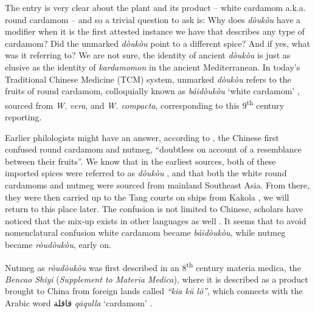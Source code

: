 \documentclass[12pt]{article}
\newcommand{\tc}[1]{\traditionalchinesefont{#1}\rmfamily}
\begin{document}

The entry is very clear about the plant and its product -- white cardamom a.k.a. round cardamom -- and so a trivial question to ask is: Why does \textit{dòukòu} have a modifier when it is the first attested instance we have that describes any type of cardamom? Did the unmarked \textit{dòukòu} point to a different spice? And if yes, what was it referring to? We are not sure, the identity of ancient \textit{dòukòu} is just as elusive as the identity of \textit{kardamomon} in the ancient Mediterranean. In today's Traditional Chinese Medicine (TCM) system, unmarked \textit{dòukòu} refers to the fruits of round cardamom, colloquially known as \textit{báidòukòu} `white cardamom' \parencites[cf.][]{polyu_2024_chinese,hkbu_2024_chinese}, sourced from \textit{W. vera}, and \textit{W. compacta}, corresponding to this 9\textsuperscript{th} century reporting.



Earlier philologists might have an answer, according to \textcite[22]{donkin_2003_east}, the Chinese first confused round cardamom and nutmeg, ``doubtless on account of a resemblance between their fruits''. We know that in the earliest sources, both of these imported spices were referred to as \textit{dòukòu} \parencites{hsu_1967_notes}{donkin_2003_east}, and that both the white round cardamoms and nutmeg were sourced from mainland Southeast Asia. From there, they were then carried up to the Tang courts on ships from Kakola \parencite[184-185]{schafer_1985_golden}, we will return to this place later. The confusion is not limited to Chinese, scholars have noticed that the mix-up exists in other languages as well \parencite[see][]{wolters_1967_early,wheatley_1961_golden}. It seems that to avoid nomenclatural confusion white cardamom became \tc{白豆蔻} \textit{báidòukòu}, while nutmeg became \tc{肉豆蔻} \textit{ròudòukòu}, early on.

Nutmeg as \tc{肉豆蔻} \textit{ròudòukòu} was first described in an 8\textsuperscript{th} century materia medica, the \tc{本草拾遺} \textit{Bencao Shiyi} (\textit{Supplement to Materia Medica}), where it is described as a product brought to China from foreign lands called \tc{迦拘勒} \textit{``kia kü lö''}, which \textcite[210]{hirth_1911_chau} connects with the Arabic word قاقلة \textit{qāqulla} `cardamom' \parencite[see also][19]{hoogervorst_2013_southeast}. 
\end{document}
